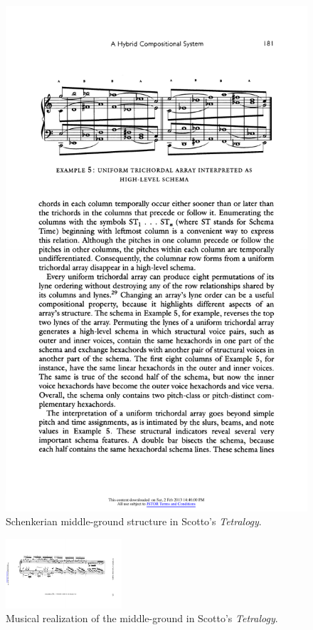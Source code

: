 \begin{example}
	\begin{figure}[htbp]
    	\centering
		\includegraphics[width=6.5in]{figures/scotto-schenker1.pdf}
		\caption[Schenkerian middle-ground structure in Scotto's \emph{Tetralogy}]{Schenkerian middle-ground structure in Scotto's \emph{Tetralogy}.}
    	\label{fig:scotto-schenker1}
	\end{figure}
	
	\begin{figure}[htbp]
    	\centering
    	\includegraphics[width=1.7in, angle=270]{figures/scotto-music1.pdf}
		\caption[Musical realization of the middle-ground in Scotto's \emph{Tetralogy}]{Musical realization of the middle-ground in Scotto's \emph{Tetralogy}.}
    	\label{fig:scotto-music1}
	\end{figure}
	

\end{example}
